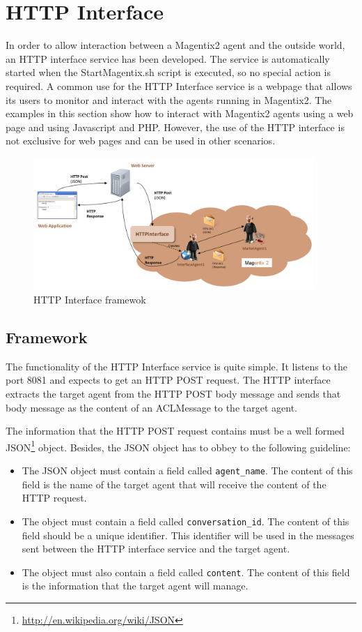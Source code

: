 \chapter{HTTP Interface} \label{chap:HTTPInterface}
In order to allow interaction between a Magentix2 agent and the outside world, an HTTP interface service has been developed. The service is automatically started when the StartMagentix.sh script is executed, so no special action is required. A common use for the HTTP Interface service is a webpage that allows its users to monitor and interact with the agents running in Magentix2. The examples in this section show how to interact with Magentix2 agents using a web page and using Javascript and PHP. However, the use of the HTTP interface is not exclusive for web pages and can be used in other scenarios.
\begin{figure}
	\centering
		\includegraphics[width=0.95\textwidth]{HTTPInterface/images/HTTPInterface.png}
	\caption{HTTP Interface framewok }
	\label{fig:HTTPInterface}
\end{figure}


\section{Framework}
The functionality of the HTTP Interface service is quite simple. It listens to the port 8081 and expects to get an HTTP POST request. The HTTP interface extracts the target agent from the HTTP POST body message and sends that body message as the content of an ACLMessage to the target agent. 

The information that the HTTP POST request contains must be a well formed JSON\footnote{\url{http://en.wikipedia.org/wiki/JSON}} object. Besides, the JSON object has to obbey to the following guideline:
\begin{itemize}
 \item The JSON object must contain a field called \texttt{agent\_name}. The content of this field is the name of the target agent that will receive the content of the HTTP request.
 \item The object must contain a field called \texttt{conversation\_id}. The content of this field should be a unique identifier. This identifier will be used in the messages sent between the HTTP interface service and the target agent.
 \item The object must also contain a field called \texttt{content}. The content of this field is the information that the target agent will manage.
\end{itemize}

